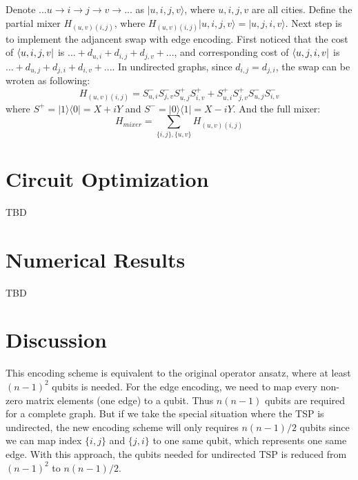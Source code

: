 \documentclass[a4paper, amsfonts, amssymb, amsmath, reprint, showkeys, nofootinbib, twoside]{revtex4-1}
\begin{document}
Denote $...u\rightarrow i \rightarrow j \rightarrow v\rightarrow...$ as $|u,i,j,v\rangle$, where $u, i, j, v$ are all cities. 
Define the partial mixer $H_{(u,v)(i,j)}$, where  $H_{(u,v)(i,j)} |u,i,j,v\rangle =|u,j,i,v\rangle$. Next step is to implement the adjancent swap with edge encoding. First noticed that the cost of $\bra{u,i,j,v}$ is $...+d_{u,i}+d_{i,j}+d_{j,v}+...$, and corresponding cost of $\bra{u,j,i,v}$ is $...+d_{u,j}+d_{j,i}+d_{i,v}+...$. In undirected graphs, since $d_{i,j}=d_{j,i}$, the swap can be wroten as following:
$$
H_{(u,v)(i,j)}= S^-_{u,i}S^-_{j,v}S^+_{u,j}S^+_{i,v}+S^+_{u,i}S^+_{j,v}S^-_{u,j}S^-_{i,v}
$$
where $S^+=|1\rangle\langle 0|=X+i Y$ and $S^-=|0\rangle\langle 1|=X-i Y$.
And the full mixer:
$$
H_{mixer}=\sum_{\{i,j\},\{u,v\}}H_{(u,v)(i,j)}
$$

\section{Circuit Optimization}
TBD
\section{Numerical Results}
TBD
\section{Discussion}
This encoding scheme is equivalent to the original operator ansatz, where at least $(n-1)^2$ qubits is needed. For the edge encoding, we need to map every non-zero matrix elements (one edge) to a qubit. Thus $n(n-1)$ qubits are required for a complete graph. But if we take the special situation where the TSP is undirected, the new encoding scheme will only requires $n(n-1)/2$ qubits since we can map index $\{i,j\}$ and $\{j,i\}$ to one same qubit, which represents one same edge. With this approach, the qubits needed for undirected TSP is reduced from $(n-1)^2$ to $n(n-1)/2$.



\end{document}
